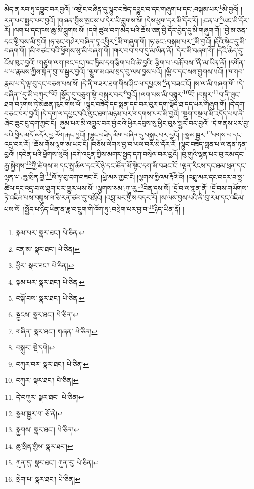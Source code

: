 མེད་ན་རབ་ཏུ་དབྱུང་བར་བྱའོ། །འགྲེང་བཞིན་དུ་ལྷུང་བཟེད་དབྱུང་བ་དང་གཞུག་པ་དང་:བསྐམ་པར་\footnote{སྐམ་པར་  སྣར་ཐང་།  པེ་ཅིན། }མི་བྱའོ། །རན་པར་སྤྱད་པར་བྱའོ། །གཞན་གྱིས་སྤངས་པ་དེར་མི་བླུགས་སོ། །དེས་ཕྱག་དར་མི་དོར་རོ། །:ངན་པ་\footnote{ངན་མ་  སྣར་ཐང་།  པེ་ཅིན། }ཡང་མི་དོར་རོ། །ལག་པ་དང་ཁས་ཆུ་མི་བླུགས་སོ། །དགེ་ཚུལ་བག་མེད་པའི་ཆོས་ཅན་བྱི་དོར་བྱེད་དུ་མི་གཞུག་གོ། །བྱེ་མ་ཅན་དང་ལྕི་བས་མི་བྱའོ། །ཧ་ཅང་གཤེར་བཞིན་དུ་འཕྱིར་\footnote{ཕྱིར་  སྣར་ཐང་།  པེ་ཅིན། }མི་གཞུག་གོ། །ཧ་ཅང་:བསྐམ་པར་\footnote{སྐམ་པར་  སྣར་ཐང་།  པེ་ཅིན། }མི་བྱའོ། །རྡོའི་སྟེང་དུ་མི་བཞག་གོ། །མི་གཙང་བའི་ཕྱོགས་སུ་མི་བཞག་གོ། །གར་བབ་བབ་དུ་མ་ཡིན་ནོ། །དེར་མི་བཞག་གོ། །དེའི་ཆེད་དུ་ངོས་ཁུང་བྱའོ། །གཙུག་ལག་ཁང་དང་ཁང་ཁྱིམ་དག་རྩིག་པའི་ཚེ་བྱའི། རྩིག་པ་:བརྐོ་བས་\footnote{བསྐོ་བས་  སྣར་ཐང་།  པེ་ཅིན། }ནི་མ་ཡིན་ནོ། །དགོན་པ་པ་རྣམས་ཀྱིས་སྐོན་བུ་ཁ་སྦྱར་བྱའོ། །ལྕུག་མའམ་སྲད་བུ་ལས་བྱས་པའོ། །ལྕི་བ་དང་སས་བྱུགས་པའོ། །ཁ་གབ་རྣམ་པ་དེ་ལྟ་བུ་དང་བཅས་པས་སོ། །དེ་ནི་གཟར་ཐག་གིས་ཤིང་ལ་དཔྱངས་\footnote{སྦྱངས་  སྣར་ཐང་།  པེ་ཅིན། }ན་བཟང་ངོ། །ས་ལ་མི་བཞག་གོ། །དེ་བཞིན་\footnote{གཞིན་  སྣར་ཐང་། གཞན་  པེ་ཅིན། }དུ་མི་བཀུར་\footnote{བསྐུར་  སྡེ་དགེ། }རོ། །སྣོད་དུ་བཅུག་སྟེ་:བསྐུར་བར་\footnote{བཀུར་བར་  སྣར་ཐང་།  པེ་ཅིན། }བྱའོ། །ལག་པས་མི་བསྐུར་\footnote{བཀུར་  སྣར་ཐང་།  པེ་ཅིན། }རོ། །བསྐུར་\footnote{དེ་བཀུར་  སྣར་ཐང་།  པེ་ཅིན། }བ་ནི་ལུང་ཐག་བཏགས་ཏེ་མཆན་ཁུང་གིས་སོ། །ལྷུང་བཟེད་དང་སྨན་དང་བར་བུར་དག་སྣོད་ཐ་དད་པར་གཞུག་གོ། །དེ་དག་བཅང་བར་བྱའོ། །དེ་དག་ལ་དཔྱང་བའི་ལུང་ཐག་མཉམ་པར་གདགས་པར་མི་བྱའོ། །སྡུག་བསྔལ་མི་འདོད་པས་ནི་ཞེང་ཆུང་ངུ་དག་ཀྱང་ངོ། །ཞུམ་པར་མི་འགྱུར་བར་བྱ་བའི་ཕྱིར་དབུས་སུ་ཕྱིང་བུས་སྦྱར་བར་བྱའོ། །དེ་གནས་པར་བྱ་བའི་ཕྱིར་མདོ་མདོར་བྱ་རོག་རྐང་བྱའོ། །ལྷུང་བཟེད་མིག་བཞིན་དུ་བསྐྱང་བར་བྱའོ། །:སྣམ་སྦྱར་\footnote{སྣམ་སྦྱར་བ་  ཅོ་ནེ། }པགས་པ་དང་འདྲ་བར་རོ། །ཆོས་གོས་ལྷག་མ་ཡང་ངོ། །བཅོས་ལེགས་བྱ་བ་ཡལ་བར་མི་དོར་རོ། །ལྷུང་བཟེད་གླན་པ་ལ་ནན་ཏན་བྱའོ། །དབེན་པའི་ཕྱོགས་སུའོ། །དགེ་འདུན་གྱིས་མགར་སྤྱད་དག་བསྲེལ་བར་བྱའོ། །བུ་གུའི་ལྷན་པར་བུ་རམ་དང་རྒྱ་སྐྱེགས་\footnote{སྐྱགས་  སྣར་ཐང་།  པེ་ཅིན། }ཀྱི་ཚིགས་མ་དང་སྤྲ་ཚིལ་དང་རོ་ཉེ་དང་ཚོན་མོ་སྟེང་དག་མི་བཟང་ངོ། །ལྷན་རིངས་དང་ཐམ་ཕྲན་དང་ལྷན་པ་:ཆུ་སྲིན་གྱི་\footnote{ཆུ་སྲིན་གྱིས་  སྣར་ཐང་། }སོ་ལྟ་བུ་དག་བཟང་ངོ། །ཕྱེ་མས་ཀྱང་ངོ། །ལྕགས་ཀྱིའམ་རྡོའི་འོ། །འབྲུ་མར་དང་བདར་བ་སྤྲ་ཚིལ་དང་འདྲ་བ་ལ་ཐུག་པར་གྱུར་པས་སོ། །ལྕགས་སམ་:ཀུ་རུ་\footnote{ཀུན་དུ་  སྣར་ཐང་། ཀུན་རུ་  པེ་ཅིན། }བིན་དས་སོ། །དྲོ་བ་ལ་གླན་ནོ། །དྲོ་བས་གཡོགས་ཏེ་འཇིམ་པས་བསྐུས་ལ་ཅི་རན་ཙམ་དུ་བསྲོའོ། །འབྲུ་མར་གྱིས་བདར་རོ། །ས་ལས་བྱས་པའི་ནི་བུ་རམ་དང་འཇིམ་པས་སོ། །སྤྱོད་པ་ཉིད་ཡིན་ན་ཟླ་བ་དྲུག་གི་འོག་ཏུ་:བསྲེག་པར་བྱ་བ་\footnote{སྲེག་པ་  སྣར་ཐང་།  པེ་ཅིན། }ཉིད་ཡིན་ནོ། །
